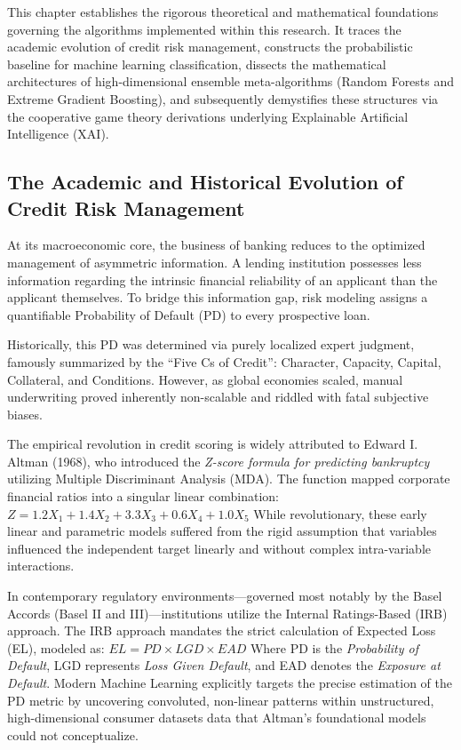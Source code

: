 This chapter establishes the rigorous theoretical and mathematical
foundations governing the algorithms implemented within this research.
It traces the academic evolution of credit risk management, constructs
the probabilistic baseline for machine learning classification, dissects
the mathematical architectures of high-dimensional ensemble
meta-algorithms (Random Forests and Extreme Gradient Boosting), and
subsequently demystifies these structures via the cooperative game
theory derivations underlying Explainable Artificial Intelligence (XAI).

\hypertarget{the-academic-and-historical-evolution-of-credit-risk-management}{%
\subsection{The Academic and Historical Evolution of Credit Risk
Management}\label{the-academic-and-historical-evolution-of-credit-risk-management}}

At its macroeconomic core, the business of banking reduces to the
optimized management of asymmetric information. A lending institution
possesses less information regarding the intrinsic financial reliability
of an applicant than the applicant themselves. To bridge this
information gap, risk modeling assigns a quantifiable Probability of
Default (PD) to every prospective loan.

Historically, this PD was determined via purely localized expert
judgment, famously summarized by the ``Five Cs of Credit'': Character,
Capacity, Capital, Collateral, and Conditions. However, as global
economies scaled, manual underwriting proved inherently non-scalable and
riddled with fatal subjective biases.

The empirical revolution in credit scoring is widely attributed to
Edward I. Altman (1968), who introduced the \emph{Z-score formula for
predicting bankruptcy} utilizing Multiple Discriminant Analysis (MDA).
The function mapped corporate financial ratios into a singular linear
combination: \(Z = 1.2X_1 + 1.4X_2 + 3.3X_3 + 0.6X_4 + 1.0X_5\) While
revolutionary, these early linear and parametric models suffered from
the rigid assumption that variables influenced the independent target
linearly and without complex intra-variable interactions.

In contemporary regulatory environments---governed most notably by the
Basel Accords (Basel II and III)---institutions utilize the Internal
Ratings-Based (IRB) approach. The IRB approach mandates the strict
calculation of Expected Loss (EL), modeled as:
\(EL = PD \times LGD \times EAD\) Where PD is the \emph{Probability of
Default}, LGD represents \emph{Loss Given Default}, and EAD denotes the
\emph{Exposure at Default}. Modern Machine Learning explicitly targets
the precise estimation of the PD metric by uncovering convoluted,
non-linear patterns within unstructured, high-dimensional consumer
datasets data that Altman's foundational models could not conceptualize.

